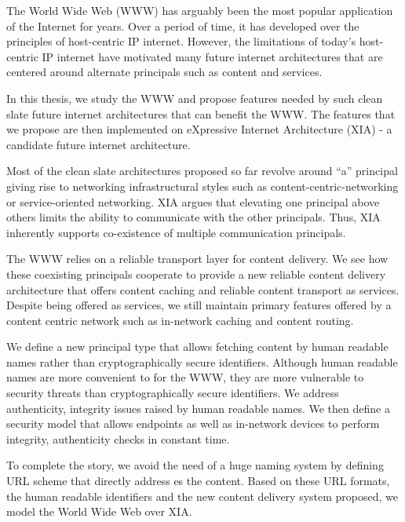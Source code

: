 \abstract

The World Wide Web (WWW) has arguably been the most popular
application of the Internet for years. Over a period of time, it has
developed over the principles of host-centric IP internet. However,
the limitations of today’s host-centric IP internet have motivated
many future internet architectures that are centered around alternate
principals such as content and services.

In this thesis, we study the WWW and propose features needed by such
clean slate future internet architectures that can benefit the
WWW. The features that we propose are then implemented on eXpressive
Internet Architecture (XIA) - a candidate future internet
architecture.

Most of the clean slate architectures proposed so far revolve around
``a'' principal giving rise to networking infrastructural styles such
as content-centric-networking or service-oriented networking. XIA
argues that elevating one principal above others limits the ability to
communicate with the other principals. Thus, XIA inherently supports
co-existence of multiple communication principals.

The WWW relies on a reliable transport layer for content delivery. We
see how these coexisting principals cooperate to provide a new
reliable content delivery architecture that offers content caching and
reliable content transport as services. Despite being offered as
services, we still maintain primary features offered by a content
centric network such as in-network caching and content routing.

We define a new principal type that allows fetching content by human
readable names rather than cryptographically secure
identifiers. Although human readable names are more convenient to for
the WWW, they are more vulnerable to security threats than
cryptographically secure identifiers. We address authenticity,
integrity issues raised by human readable names. We then define a
security model that allows endpoints as well as in-network devices to
perform integrity, authenticity checks in constant time.

To complete the story, we avoid the need of a huge naming system by
defining URL scheme that directly address es the content. Based on
these URL formats, the human readable identifiers and the new content
delivery system proposed, we model the World Wide Web over XIA.
